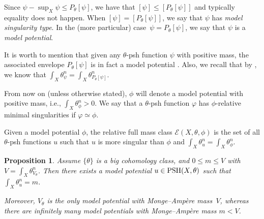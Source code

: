\documentclass[pdftex]{sigma}
\numberwithin{equation}{section}
\newtheorem{Proposition}[Theorem]{Proposition}
{ \theoremstyle{definition}
\newtheorem{Definition}[Theorem]{Definition}
\newtheorem{Note}[Theorem]{Note}
\newtheorem{Example}[Theorem]{Example}
\newtheorem{Remark}[Theorem]{Remark}
\newtheorem{Question}[Theorem]{Question}
}
\theoremstyle{plain}
\newcommand \PSH {{\rm PSH}}
\begin{document}
Since $\psi - \sup_X \psi \leq P_\theta[\psi]$, we have that $[\psi] \leq [P_\theta[\psi]]$ and typically equality does not happen. When $[\psi] = [P_\theta[\psi]]$, we say that $\psi$ has \emph{model singularity type}. In the (more particular) case~${\psi = P_\theta[\psi]}$, we say that $\psi$ is a \emph{model potential}.

It is worth to mention that given any $\theta$-psh function $\psi$ with positive mass, the associated envelope $P_\theta[\psi]$ is in fact a model potential \cite[Theorem~3.14]{DDL6}.
Also, we recall that by \cite[Remark~3.4]{DDL6}, we know that $\int_X \theta_\psi^n = \int_X \theta_{P_\theta[\psi]}^n$.

From now on (unless otherwise stated), $\phi$ will denote a model potential with positive mass, i.e., $\int_X \theta_\phi^n>0$. We say that a $\theta$-psh function $\varphi$ has $\phi$-relative minimal singularities if $\varphi \simeq \phi$.

\begin{Definition}
Given a model potential $\phi$, the relative full mass class $\mathcal{E}(X,\theta,\phi)$ is the set of all $\theta$-psh functions $u$ such that $u$ is more singular than $\phi$ and $\int_X \theta_u^n=\int_X \theta_{\phi}^n$.
\end{Definition}

\begin{Proposition}\label{mass}
Assume $\{ \theta \}$ is a big cohomology class, and $0 \leq m \leq V$ with $V = \int_X \theta_{V_\theta}^n$. Then there exists a model potential $ u \in \PSH(X,\theta)$ such that $\int_X \theta_u^n = m$.

Moreover, $V_\theta$ is the only model potential with Monge--Amp\`ere mass~$V$, whereas there are infinitely many model potentials with Monge--Amp\`ere mass $m < V$.
\end{Proposition}
\end{document}

